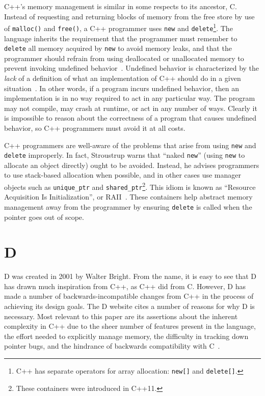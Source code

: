 \documentclass[finalcopy,short]{srpaper}
\begin{document}
C++'s memory management is similar in some respects to its ancestor, C. Instead
of requesting and returning blocks of memory from the free store by use of
\texttt{malloc()} and \texttt{free()}, a C++ programmer uses \texttt{new} and
\texttt{delete}\footnote{C++ has separate operators for array allocation:
    \texttt{new[]} and \texttt{delete[]}.}. The language inherits the
requirement that the programmer must remember to \texttt{delete} all memory
acquired by \texttt{new} to avoid memory leaks, and that the programmer should
refrain from using deallocated or unallocated memory to prevent invoking
undefined behavior~\cite{stroustrup2013the}. Undefined behavior is
characterized by the \textit{lack} of a definition of what an implementation of
C++ should do in a given situation~\cite{iso/iec}. In other words, if a program
incurs undefined behavior, then an implementation is in no way required to act
in any particular way. The program may not compile, may crash at runtime, or
act in any number of ways. Clearly it is impossible to reason about the
correctness of a program that causes undefined behavior, so C++ programmers
must avoid it at all costs.

C++ programmers are well-aware of the problems that arise from using
\texttt{new} and \texttt{delete} improperly. In fact, Stroustrup warns that
``naked \texttt{new}'' (using \texttt{new} to allocate an object directly)
ought to be avoided. Instead, he advises programmers to use stack-based
allocation when possible, and in other cases use manager objects such as
\texttt{unique\_ptr} and \texttt{shared\_ptr}\footnote{These containers were
    introduced in C++11.}. This idiom is known as ``Resource Acquisition Is
Initialization'', or RAII~\cite{stroustrup2013the}. These containers help
abstract memory management away from the programmer by ensuring \texttt{delete}
is called when the pointer goes out of scope.

\section{D}

D was created in 2001 by Walter Bright. From the name, it is easy to see that D
has drawn much inspiration from C++, as C++ did from C. However, D has made a
number of backwards-incompatible changes from C++ in the process of achieving
its design goals. The D website cites a number of reasons for why D is
necessary. Most relevant to this paper are its assertions about the inherent
complexity in C++ due to the sheer number of features present in the language,
the effort needed to explicitly manage memory, the difficulty in tracking down
pointer bugs, and the hindrance of backwards compatibility with
C~\cite{Doverview}.
\end{document}
